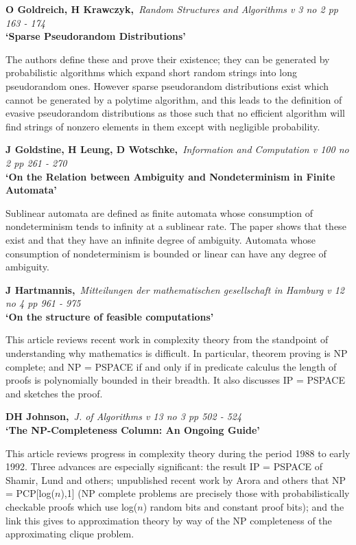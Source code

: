 {\bf \noindent O Goldreich, H Krawczyk,}{\em ~Random Structures and Algorithms
v 3 no 2 pp 163 - 174\\}
{\bf `Sparse Pseudorandom Distributions'}

The authors define these and prove their existence; they can be generated by
probabilistic algorithms which expand short random strings into long
pseudorandom ones. However sparse pseudorandom distributions exist which cannot
be generated by a polytime algorithm, and this leads to the definition of 
evasive pseudorandom distributions as those such that no efficient algorithm
will find strings of nonzero elements in them except with negligible 
probability.

{\bf \noindent J Goldstine, H Leung, D Wotschke,}{\em ~Information and 
Computation v 100 no 2 pp 261 - 270\\}
{\bf `On the Relation between Ambiguity and Nondeterminism in Finite Automata'}

Sublinear automata are defined as finite automata whose consumption of
nondeterminism tends to infinity at a sublinear rate. The paper shows that 
these exist and that they have an infinite degree of ambiguity. Automata
whose consumption of nondeterminism is bounded or linear can have any degree
of ambiguity.

\pagebreak

{\bf \noindent J Hartmannis,}{\em ~Mitteilungen der mathematischen 
gesellschaft in Hamburg v 12 no 4 pp 961 - 975\\}
{\bf `On the structure of feasible computations'}

This article reviews recent work in complexity theory from the standpoint of
understanding why mathematics is difficult. In particular, theorem proving is
NP complete; and NP = PSPACE if and only if in predicate calculus the length
of proofs is polynomially bounded in their breadth. It also discusses
IP = PSPACE and sketches the proof.

{\bf \noindent DH Johnson,}{\em ~J. of Algorithms v 13 no 3 pp 502 - 524\\}
{\bf `The NP-Completeness Column: An Ongoing Guide'}

This article reviews progress in complexity theory during the period 1988 to
early 1992. Three advances are especially significant: the result IP =
PSPACE of Shamir, Lund and others; unpublished recent work by Arora and
others that NP = PCP[log($n$),1] (NP complete problems are precisely those
with probabilistically checkable proofs which use log($n$) random bits and 
constant proof bits); and the link this gives to approximation theory by way
of the NP completeness of the approximating clique problem.

